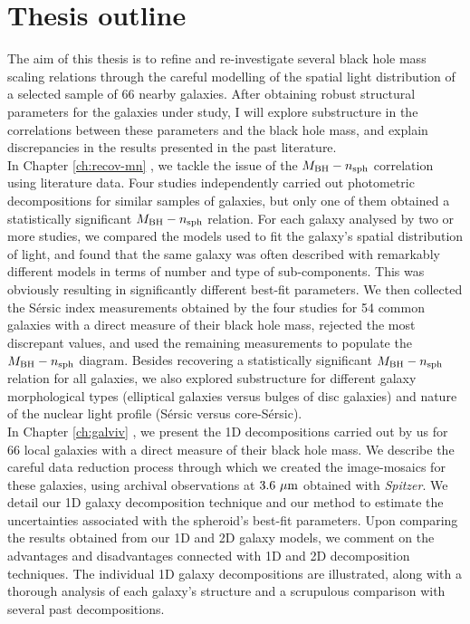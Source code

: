 \section{Thesis outline}
The aim of this thesis is to refine and re-investigate several black hole mass scaling relations 
through the careful modelling of the spatial light distribution 
of a selected sample of 66 nearby galaxies. 
After obtaining robust structural parameters for the galaxies under study, 
I will explore substructure in the correlations between these parameters and the black hole mass, 
and explain discrepancies in the results presented in the past literature. \\

In Chapter \ref{ch:recov-mn} \citep{savorgnan2013}, 
we tackle the issue of the $M_{\rm BH} - n_{\rm sph}$ correlation using literature data. 
Four studies independently carried out photometric decompositions for similar samples of galaxies, 
but only one of them obtained a statistically significant $M_{\rm BH} - n_{\rm sph}$ relation. 
For each galaxy analysed by two or more studies, 
we compared the models used to fit the galaxy's spatial distribution of light, 
and found that the same galaxy was often described with remarkably different models 
in terms of number and type of sub-components. 
This was obviously resulting in significantly different best-fit parameters. 
We then collected the S\'ersic index measurements obtained by the four studies for 54 common galaxies 
with a direct measure of their black hole mass, 
rejected the most discrepant values, 
and used the remaining measurements to populate the $M_{\rm BH} - n_{\rm sph}$ diagram. 
Besides recovering a statistically significant $M_{\rm BH} - n_{\rm sph}$ relation for all galaxies, 
we also explored substructure for different galaxy morphological types 
(elliptical galaxies versus bulges of disc galaxies)
and nature of the nuclear light profile (S\'ersic versus core-S\'ersic). \\

In Chapter \ref{ch:galviv} \citep{paperI}, 
we present the 1D decompositions carried out by us for 66 local galaxies 
with a direct measure of their black hole mass. 
We describe the careful data reduction process through which 
we created the image-mosaics for these galaxies, 
using archival observations at $3.6~\mu \rm m$ obtained with \emph{Spitzer}. 
We detail our 1D galaxy decomposition technique and our method to estimate the uncertainties 
associated with the spheroid's best-fit parameters. 
Upon comparing the results obtained from our 1D and 2D galaxy models, 
we comment on the advantages and disadvantages connected with 1D and 2D decomposition techniques. 
The individual 1D galaxy decompositions are illustrated, 
along with a thorough analysis of each galaxy's structure 
and a scrupulous comparison with several past decompositions. \\
 
